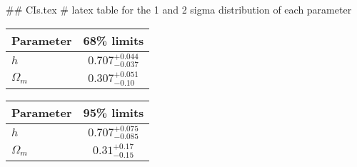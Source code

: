 ## CIs.tex
# latex table for the 1 and 2 sigma distribution of each parameter

\begin{tabular} { l  c}
 Parameter &  68\% limits\\
\hline
{\boldmath$h              $} & $0.707^{+0.044}_{-0.037}   $\\
{\boldmath$\Omega_m       $} & $0.307^{+0.051}_{-0.10}    $\\
\hline
\end{tabular}

\begin{tabular} { l  c}
 Parameter &  95\% limits\\
\hline
{\boldmath$h              $} & $0.707^{+0.075}_{-0.085}   $\\
{\boldmath$\Omega_m       $} & $0.31^{+0.17}_{-0.15}      $\\
\hline
\end{tabular}
